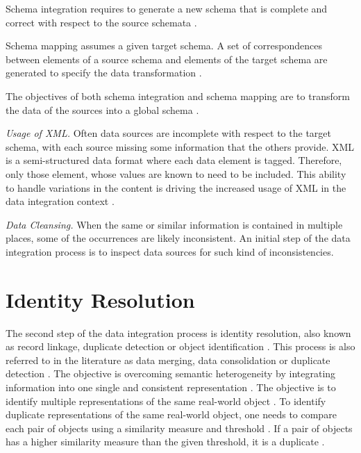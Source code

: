 Schema integration requires to generate a new schema that is complete and correct with respect to the source schemata \cite{Bleiholder2009DataF}.

Schema mapping assumes a given target schema. A set of correspondences between elements of a source schema and elements of the target schema are generated to specify the data transformation \cite{Bleiholder2009DataF}.

The objectives of both schema integration and schema mapping are to transform the data of the sources into a global schema \cite{Bleiholder2009DataF}.



\textit{Usage of XML.} Often data sources are incomplete with respect to the target schema, with each source missing some information that the others provide. XML is a semi-structured data format where each data element is tagged. Therefore, only those element, whose values are known to need to be included. This ability to handle variations in the content is driving the increased usage of XML in the data integration context \cite{Bernstein2008InformationII}.

\textit{Data Cleansing.} When the same or similar information is contained in multiple places, some of the occurrences are likely inconsistent. An initial step of the data integration process is to inspect data sources for such kind of inconsistencies.

\section{Identity Resolution}

The second step of the data integration process is identity resolution, also known as record linkage, duplicate detection or object identification \cite{Bleiholder2009DataF}.
This process is also referred to in the literature as data merging, data consolidation or duplicate detection \cite{Bleiholder2009DataF}.
The objective is overcoming semantic heterogeneity by integrating information into one single and consistent representation \cite{Bleiholder2009DataF}.
The objective is to identify multiple representations of the same real-world object \cite{Bleiholder2009DataF}.
To identify duplicate representations of the same real-world object, one needs to compare each pair of objects using a similarity measure and threshold \cite{Bleiholder2009DataF}.
If a pair of objects has a higher similarity measure than the given threshold, it is a duplicate \cite{Bleiholder2009DataF}.

